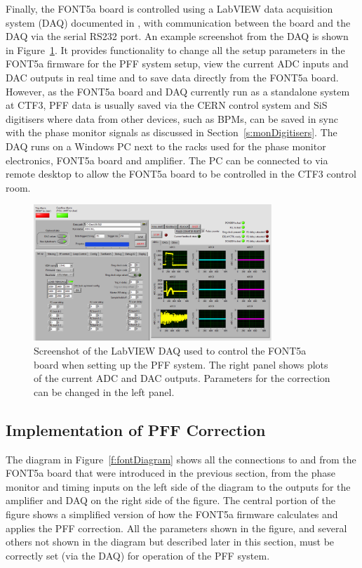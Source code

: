Finally, the FONT5a board is controlled using a LabVIEW data acquisition system (DAQ) documented in \cite{dougThesis}, with communication between the board and the DAQ via the serial RS232 port. An example screenshot from the DAQ is shown in Figure~\ref{f:DAQScreenshot}. It provides functionality to change all the setup parameters in the FONT5a firmware for the PFF system setup, view the current ADC inputs and DAC outputs in real time and to save data directly from the FONT5a board. However, as the FONT5a board and DAQ currently run as a standalone system at CTF3, PFF data is usually saved via the CERN control system and SiS digitisers where data from other devices, such as BPMs, can be saved in sync with the phase monitor signals as discussed in Section~\ref{s:monDigitisers}. The DAQ runs on a Windows PC next to the racks used for the phase monitor electronics, FONT5a board and amplifier. The PC can be connected to via remote desktop to allow the FONT5a board to be controlled in the CTF3 control room.

\begin{figure}
  \centering
  \includegraphics[width=0.8\textwidth]{Figures/commissioning/DAQScreenshot}
  \caption{Screenshot of the LabVIEW DAQ used to control the FONT5a board when setting up the PFF system. The right panel shows plots of the current ADC and DAC outputs. Parameters for the correction can be changed in the left panel.}
  \label{f:DAQScreenshot}
\end{figure}

\subsection{Implementation of PFF Correction}
\label{ss:pffFirmware}

The diagram in Figure~\ref{f:fontDiagram} shows all the connections to and from the FONT5a board that were introduced in the previous section, from the phase monitor and timing inputs on the left side of the diagram to the outputs for the amplifier and DAQ on the right side of the figure. The central portion of the figure shows a simplified version of how the FONT5a firmware calculates and applies the PFF correction. All the parameters shown in the figure, and several others not shown in the diagram but described later in this section, must be correctly set (via the DAQ) for operation of the PFF system.

